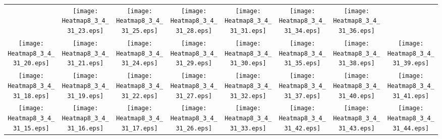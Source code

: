 \documentclass{standalone}
\begin{document}
\renewcommand{\arraystretch}{0}
\setlength{\tabcolsep}{0pt}
\begin{tabular}{ *8{c} }
 & \texttt{[image: Heatmap8\_3\_4\_31\_23.eps]} & \texttt{[image: Heatmap8\_3\_4\_31\_25.eps]} & \texttt{[image: Heatmap8\_3\_4\_31\_28.eps]} & \texttt{[image: Heatmap8\_3\_4\_31\_31.eps]} & \texttt{[image: Heatmap8\_3\_4\_31\_34.eps]} & \texttt{[image: Heatmap8\_3\_4\_31\_36.eps]} &  \\
\texttt{[image: Heatmap8\_3\_4\_31\_20.eps]} & \texttt{[image: Heatmap8\_3\_4\_31\_21.eps]} & \texttt{[image: Heatmap8\_3\_4\_31\_24.eps]} & \texttt{[image: Heatmap8\_3\_4\_31\_29.eps]} & \texttt{[image: Heatmap8\_3\_4\_31\_30.eps]} & \texttt{[image: Heatmap8\_3\_4\_31\_35.eps]} & \texttt{[image: Heatmap8\_3\_4\_31\_38.eps]} & \texttt{[image: Heatmap8\_3\_4\_31\_39.eps]} \\
\texttt{[image: Heatmap8\_3\_4\_31\_18.eps]} & \texttt{[image: Heatmap8\_3\_4\_31\_19.eps]} & \texttt{[image: Heatmap8\_3\_4\_31\_22.eps]} & \texttt{[image: Heatmap8\_3\_4\_31\_27.eps]} & \texttt{[image: Heatmap8\_3\_4\_31\_32.eps]} & \texttt{[image: Heatmap8\_3\_4\_31\_37.eps]} & \texttt{[image: Heatmap8\_3\_4\_31\_40.eps]} & \texttt{[image: Heatmap8\_3\_4\_31\_41.eps]} \\
\texttt{[image: Heatmap8\_3\_4\_31\_15.eps]} & \texttt{[image: Heatmap8\_3\_4\_31\_16.eps]} & \texttt{[image: Heatmap8\_3\_4\_31\_17.eps]} & \texttt{[image: Heatmap8\_3\_4\_31\_26.eps]} & \texttt{[image: Heatmap8\_3\_4\_31\_33.eps]} & \texttt{[image: Heatmap8\_3\_4\_31\_42.eps]} & \texttt{[image: Heatmap8\_3\_4\_31\_43.eps]} & \texttt{[image: Heatmap8\_3\_4\_31\_44.eps]} \\

\end{tabular}
\end{document}
